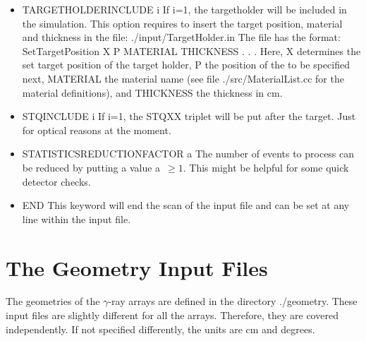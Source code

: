 \documentclass[12pt]{book}
\begin{document}
\begin{itemize}
\item TARGETHOLDERINCLUDE i\hfill{} \linebreak
  If i=1, the targetholder will be included in the simulation. This option requires to insert the target 
  position, material and thickness in the file:
\linebreak
\linebreak
{\ttfamily ./input/TargetHolder.in}
\linebreak
\linebreak
 The file has the format:\hfill{}
\linebreak
\linebreak
{ SetTargetPosition X}\linebreak
{\ttfamily P MATERIAL THICKNESS\linebreak
.\linebreak
.\linebreak
.\linebreak}
\linebreak
\linebreak
Here, {\ttfamily X} determines the set target position of the target holder, {\ttfamily P} the position of the 
to be specified next, {\ttfamily MATERIAL} the material name (see file {\ttfamily ./src/MaterialList.cc} for the
material definitions), and {\ttfamily THICKNESS} the thickness in cm.
\item STQINCLUDE i\hfill{} \linebreak
  If i=1, the STQXX triplet will be put after the target. Just for optical reasons at the moment.
\item STATISTICSREDUCTIONFACTOR a\hfill{} \linebreak
  The number of events to process can be reduced by putting a value a~$\ge 1$. This might be helpful for some quick detector checks.
\item END  \hfill{} \linebreak
  This keyword will end the scan of the input file and can be set at any line within the input file.
\end{itemize}

\section{The Geometry Input Files}
\label{Geometry}

The geometries of the $\gamma$-ray arrays are defined in the directory {\ttfamily ./geometry}.
These input files are slightly different for all the arrays. Therefore,
they are covered independently. If not specified differently, the units are cm and degrees.
\end{document}
